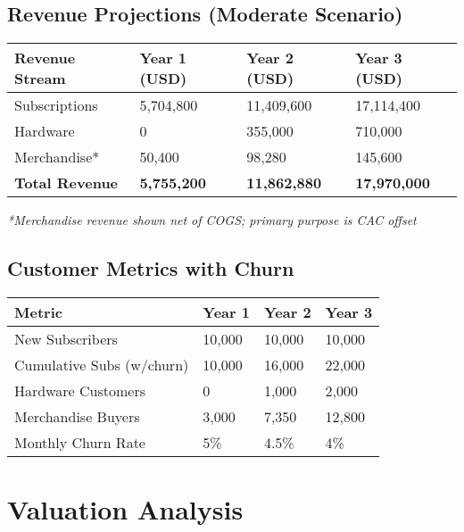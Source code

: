 \documentclass[11pt]{article}
\begin{document}
\subsection{Revenue Projections (Moderate Scenario)}
\begin{table}[H]
\centering
\begin{tabularx}{\linewidth}{l Y Y Y}
\toprule
Revenue Stream & Year 1 (USD) & Year 2 (USD) & Year 3 (USD) \\\midrule
Subscriptions & 5,704,800 & 11,409,600 & 17,114,400 \\
Hardware & 0 & 355,000 & 710,000 \\
Merchandise* & 50,400 & 98,280 & 145,600 \\\midrule
\textbf{Total Revenue} & \textbf{5,755,200} & \textbf{11,862,880} & \textbf{17,970,000} \\
\bottomrule
\end{tabularx}
\end{table}
\textit{*Merchandise revenue shown net of COGS; primary purpose is CAC offset}

\subsection{Customer Metrics with Churn}
\begin{table}[H]
\centering
\begin{tabularx}{\linewidth}{l Y Y Y}
\toprule
Metric & Year 1 & Year 2 & Year 3 \\\midrule
New Subscribers & 10,000 & 10,000 & 10,000 \\
Cumulative Subs (w/churn) & 10,000 & 16,000 & 22,000 \\
Hardware Customers & 0 & 1,000 & 2,000 \\
Merchandise Buyers & 3,000 & 7,350 & 12,800 \\
Monthly Churn Rate & 5\% & 4.5\% & 4\% \\
\bottomrule
\end{tabularx}
\end{table}

\section{Valuation Analysis}
\end{document}

